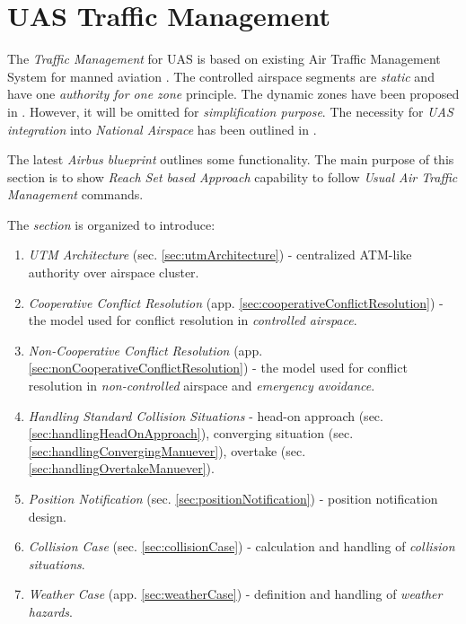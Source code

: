 \cleardoublepage
\section{UAS Traffic Management}\label{sec:UASTrafficManagement}

\noindent The \emph{Traffic Management} for UAS is based on existing Air Traffic Management System for manned aviation \cite{icao4444}. The controlled airspace segments are \emph{static} and have one \emph{authority for one zone} principle. The dynamic zones have been proposed in \cite{gerdes2016dynamic}. However, it will be omitted for \emph{simplification purpose}. The necessity for \emph{UAS integration} into \emph{National Airspace} has been outlined in \cite{spriesterbach2013unmanned}.

The latest \emph{Airbus blueprint} \cite{airbusUTM2018blueprint} outlines some functionality. The main purpose of this section is to show \emph{Reach Set based Approach} capability to follow \emph{Usual Air Traffic Management} commands.

The \emph{section} is organized to introduce:
\begin{enumerate}
    \item \emph{UTM Architecture} (sec. \ref{sec:utmArchitecture}) - centralized ATM-like authority over airspace cluster.
    
    \item \emph{Cooperative Conflict Resolution} (app. \ref{sec:cooperativeConflictResolution}) - the model used for conflict resolution in \emph{controlled airspace}.
    
    \item \emph{Non-Cooperative Conflict Resolution} (app. \ref{sec:nonCooperativeConflictResolution})  - the model used for conflict resolution in \emph{non-controlled} airspace and \emph{emergency avoidance}.
    
    \item \emph{Handling Standard Collision Situations} - head-on approach (sec. \ref{sec:handlingHeadOnApproach}), converging situation (sec. \ref{sec:handlingConvergingManuever}), overtake (sec. \ref{sec:handlingOvertakeManuever}).
    
    \item \emph{Position Notification} (sec. \ref{sec:positionNotification}) - position notification design.
    
    \item \emph{Collision Case} (sec. \ref{sec:collisionCase}) - calculation and handling of \emph{collision situations}.
    
    \item \emph{Weather Case} (app. \ref{sec:weatherCase}) - definition and handling of \emph{weather hazards}.
\end{enumerate}